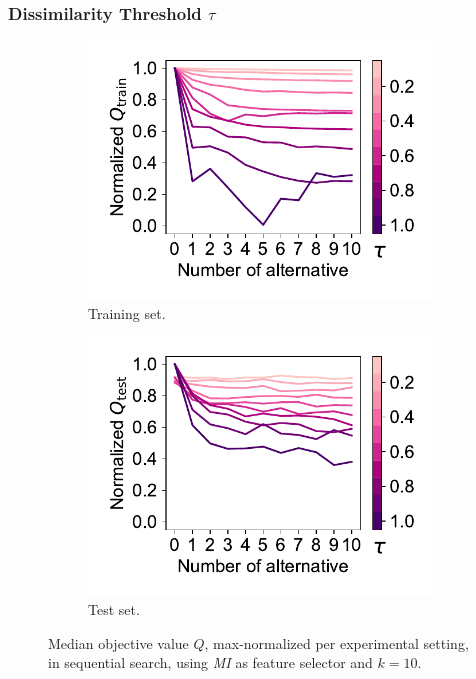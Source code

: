 \documentclass{article}
\theoremstyle{definition}
\begin{document}
\subsubsection{Dissimilarity Threshold \texorpdfstring{$\tau$}{}} %
\label{sec:afs:evaluation:search:tau}

\begin{figure}[htb]
	\centering
	\begin{subfigure}{0.48\textwidth}
		\centering
		\includegraphics[width=\textwidth, trim=15 15 10 15, clip]{plots/impact-num-alternatives-train-objective-tau.pdf}
		\caption{Training set.}
		\label{fig:afs:impact-num-alternatives-train-objective-tau}
	\end{subfigure}
	\hfill
	\begin{subfigure}{0.48\textwidth}
		\centering
		\includegraphics[width=\textwidth, trim=15 15 10 15, clip]{plots/impact-num-alternatives-test-objective-tau.pdf}
		\caption{Test set.}
		\label{fig:afs:impact-num-alternatives-test-objective-tau}
	\end{subfigure}
	\caption{Median objective value $Q$, max-normalized per experimental setting, in sequential search, using \emph{MI} as feature selector and $k=10$.}
	\label{fig:afs:impact-num-alternatives-objective-tau}
\end{figure}
\end{document}
